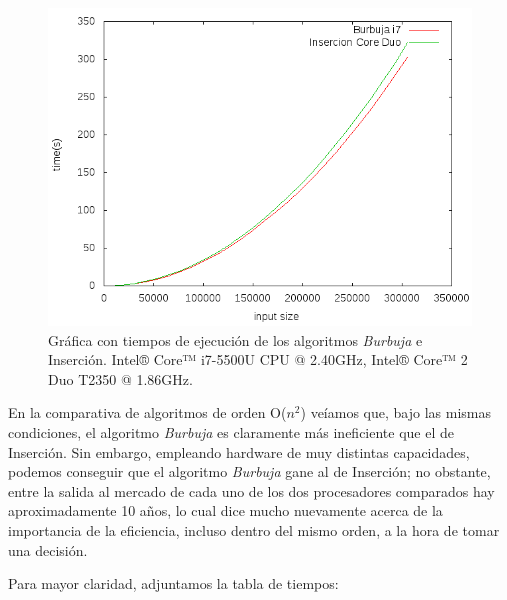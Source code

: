 \documentclass[11pt,a4paper]{article}
\begin{document}
				\begin{figure}[h]

					\centering
					\includegraphics[width=1\textwidth]{burbuja_vs_insercion.png}
					\caption{Gráfica con tiempos de ejecución de los algoritmos \textit{Burbuja} e Inserción. Intel® Core™ i7-5500U CPU @ 2.40GHz, Intel® Core™ 2 Duo T2350 @ 1.86GHz.}

				\end{figure}

				\par
				En la comparativa de algoritmos de orden O($n^2$) veíamos que, bajo las mismas condiciones, el algoritmo \textit{Burbuja} es claramente más ineficiente que el de Inserción. Sin embargo, empleando hardware de muy distintas capacidades, podemos conseguir que el algoritmo \textit{Burbuja} gane al de Inserción; no obstante, entre la salida al mercado de cada uno de los dos procesadores comparados hay aproximadamente 10 años, lo cual dice mucho nuevamente acerca de la importancia de la eficiencia, incluso dentro del mismo orden, a la hora de tomar una decisión.

\newpage

			\par
			Para mayor claridad, adjuntamos la tabla de tiempos:
\end{document}
